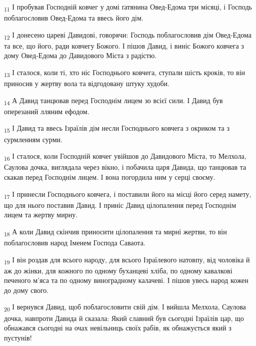 \begin{tcolorbox}
\textsubscript{11} І пробував Господній ковчег у домі ґатянина Овед-Едома три місяці, і Господь поблагословив Овед-Едома та ввесь його дім.
\end{tcolorbox}
\begin{tcolorbox}
\textsubscript{12} І донесено цареві Давидові, говорячи: Господь поблагословив дім Овед-Едома та все, що його, ради ковчегу Божого. І пішов Давид, і виніс Божого ковчега з дому Овед-Едома до Давидового Міста з радістю.
\end{tcolorbox}
\begin{tcolorbox}
\textsubscript{13} І сталося, коли ті, хто ніс Господнього ковчега, ступали шість кроків, то він приносив у жертву вола та відгодовану штуку худоби.
\end{tcolorbox}
\begin{tcolorbox}
\textsubscript{14} А Давид танцював перед Господнім лицем зо всієї сили. І Давид був оперезаний лляним ефодом.
\end{tcolorbox}
\begin{tcolorbox}
\textsubscript{15} І Давид та ввесь Ізраїлів дім несли Господнього ковчега з окриком та з сурмленням сурми.
\end{tcolorbox}
\begin{tcolorbox}
\textsubscript{16} І сталося, коли Господній ковчег увійшов до Давидового Міста, то Мелхола, Саулова дочка, виглядала через вікно, і побачила царя Давида, що танцював та скакав перед Господнім лицем. І вона погордила ним у серці своєму.
\end{tcolorbox}
\begin{tcolorbox}
\textsubscript{17} І принесли Господнього ковчега, і поставили його на місці його серед намету, що для нього поставив Давид. І приніс Давид цілопалення перед Господнім лицем та жертву мирну.
\end{tcolorbox}
\begin{tcolorbox}
\textsubscript{18} А коли Давид скінчив приносити цілопалення та мирні жертви, то він поблагословив народ Іменем Господа Саваота.
\end{tcolorbox}
\begin{tcolorbox}
\textsubscript{19} І він роздав для всього народу, для всього Ізраїлевого натовпу, від чоловіка й аж до жінки, для кожного по одному буханцеві хліба, по одному кавалкові печеного м'яса та по одному виноградному калачеві. І пішов увесь народ кожен до дому свого.
\end{tcolorbox}
\begin{tcolorbox}
\textsubscript{20} І вернувся Давид, щоб поблагословити свій дім. І вийшла Мелхола, Саулова дочка, навпроти Давида й сказала: Який славний був сьогодні Ізраїлів цар, що обнажався сьогодні на очах невільниць своїх рабів, як обнажується який з пустунів!
\end{tcolorbox}
